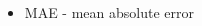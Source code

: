 \documentclass[8pt,xcolor=table,aspectratio=169]{beamer}
\begin{document}
\begin{frame}
\begin{columns}[t]
\begin{column}[t]{0.4\textwidth}
\begin{table}
\begin{tabular}{l|>{\centering\arraybackslash}m{1cm}|>{\centering\arraybackslash}m{1cm}}
\end{tabular}
\end{table}

\begin{itemize}
 \item MAE - mean absolute error
\end{itemize}

\end{column}
\end{columns}

\end{frame}
\end{document}
